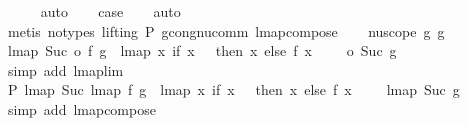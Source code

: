\begin{isabellebody}
\ \ \ \ \isamarkupfalse%
\ auto\isanewline
\isanewline
\ \ \isamarkupfalse%
\ {\isacharquery}{\kern0pt}case\isanewline
\ \ \isamarkupfalse%
\ auto\isanewline
\ \ \ \isamarkupfalse%
\ {\isacharparenleft}{\kern0pt}metis\ {\isacharparenleft}{\kern0pt}no{\isacharunderscore}{\kern0pt}types{\isacharcomma}{\kern0pt}\ lifting{\isacharparenright}{\kern0pt}\ P{}\ gcong{\isachardot}{\kern0pt}nu{\isacharunderscore}{\kern0pt}comm\ lmap{\isacharunderscore}{\kern0pt}compose{\isacharparenright}{\kern0pt}\isanewline
{}\isamarkupfalse%
\isanewline
\ \ \isamarkupfalse%
\ {\isacharparenleft}{\kern0pt}nu{\isacharunderscore}{\kern0pt}scope\ g{}\ g{}{\isacharparenright}{\kern0pt}\isanewline
\ \ \isamarkupfalse%
\ {\isachardoublequoteopen}lmap\ {\isacharparenleft}{\kern0pt}Suc\ o\ f{\isacharparenright}{\kern0pt}\ g{}\ {\isacharequal}{\kern0pt}\ lmap\ {\isacharparenleft}{\kern0pt}{\isacharparenleft}{\kern0pt}{\isasymlambda}x{\isachardot}{\kern0pt}\ if\ x\ {\isacharequal}{\kern0pt}\ {}\ then\ x\ else\ f\ {\isacharparenleft}{\kern0pt}x\ {\isacharminus}{\kern0pt}\ {}{\isacharparenright}{\kern0pt}\ {\isacharplus}{\kern0pt}\ {}{\isacharparenright}{\kern0pt}\ o\ Suc{\isacharparenright}{\kern0pt}\ g{}{\isachardoublequoteclose}\isanewline
\ \ \ \ \ \isamarkupfalse%
\ {\isacharparenleft}{\kern0pt}simp\ add{\isacharcolon}{\kern0pt}\ lmap{\isacharunderscore}{\kern0pt}lim{\isacharparenright}{\kern0pt}\isanewline
\ \ \isamarkupfalse%
\ \isamarkupfalse%
\ P{}{\isacharcolon}{\kern0pt}\ {\isachardoublequoteopen}lmap\ Suc\ {\isacharparenleft}{\kern0pt}lmap\ f\ g{}{\isacharparenright}{\kern0pt}\ {\isacharequal}{\kern0pt}\ lmap\ {\isacharparenleft}{\kern0pt}{\isasymlambda}x{\isachardot}{\kern0pt}\ if\ x\ {\isacharequal}{\kern0pt}\ {}\ then\ x\ else\ f\ {\isacharparenleft}{\kern0pt}x\ {\isacharminus}{\kern0pt}\ {}{\isacharparenright}{\kern0pt}\ {\isacharplus}{\kern0pt}\ {}{\isacharparenright}{\kern0pt}\ {\isacharparenleft}{\kern0pt}lmap\ Suc\ g{}{\isacharparenright}{\kern0pt}{\isachardoublequoteclose}\isanewline
\ \ \ \ \ \isamarkupfalse%
\ {\isacharparenleft}{\kern0pt}simp\ add{\isacharcolon}{\kern0pt}\ lmap{\isacharunderscore}{\kern0pt}compose{\isacharparenright}{\kern0pt}\isanewline
\isanewline
\ \ \isamarkupfalse%

\end{isabellebody}
